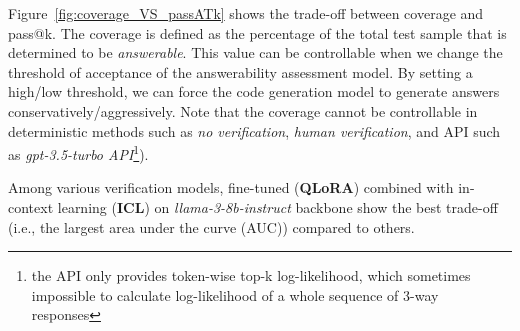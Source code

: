 Figure~\ref{fig:coverage_VS_passATk} shows the trade-off between coverage and pass@k. The coverage is defined as the percentage of the total test sample that is determined to be \textit{answerable}. This value can be controllable when we change the threshold of acceptance of the answerability assessment model. By setting a high/low threshold, we can force the code generation model to generate answers conservatively/aggressively.
Note that the coverage cannot be controllable in deterministic methods such as \textit{no verification}, \textit{human verification}, and API such as \textit{gpt-3.5-turbo API}\footnote{the API only provides token-wise top-k log-likelihood, which sometimes impossible to calculate log-likelihood of a whole sequence of 3-way responses}).

Among various verification models, fine-tuned (\textbf{QLoRA}) combined with in-context learning (\textbf{ICL}) on \textit{llama-3-8b-instruct} backbone show the best trade-off (i.e., the largest area under the curve (AUC)) compared to others.

